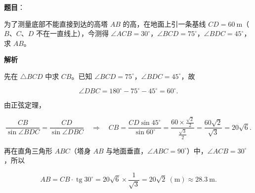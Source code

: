 \begin{answer}

\textbf{题目}：

为了测量底部不能直接到达的高塔 $AB$ 的高，在地面上引一条基线 $CD=60\ \mathrm m$（$B$、$C$、$D$ 不在一直线上），今测得 $\angle ACB=30^\circ$，$\angle BCD=75^\circ$，$\angle BDC=45^\circ$，求 $AB$。
\nopagebreak[4]
\begin{center}\end{center}
\nopagebreak[4]
\textbf{解析}
\nopagebreak[4]
\begin{center}\end{center}
\nopagebreak[4]
先在 $\triangle BCD$ 中求 $CB$。已知 $\angle BCD=75^\circ$，$\angle BDC=45^\circ$，故

\nopagebreak[4]
\[
\angle DBC=180^\circ-75^\circ-45^\circ=60^\circ.
\]

由正弦定理，

\nopagebreak[4]
\[
\frac{CB}{\sin\angle BDC}=\frac{CD}{\sin\angle DBC}
\quad\Longrightarrow\quad
CB=\frac{CD\sin45^\circ}{\sin60^\circ}
=\frac{60\times\frac{\sqrt2}{2}}{\frac{\sqrt3}{2}}
=\frac{60\sqrt2}{\sqrt3}=20\sqrt6.
\]

再在直角三角形 $ABC$（塔身 $AB$ 与地面垂直，$\angle ABC=90^\circ$）中，$\angle ACB=30^\circ$，所以

\nopagebreak[4]
\[
AB=CB\cdot\operatorname{tg}30^\circ=20\sqrt6\times\frac{1}{\sqrt3}=20\sqrt2\ (\mathrm m)\approx28.3\ \mathrm m.
\]


\end{answer}
